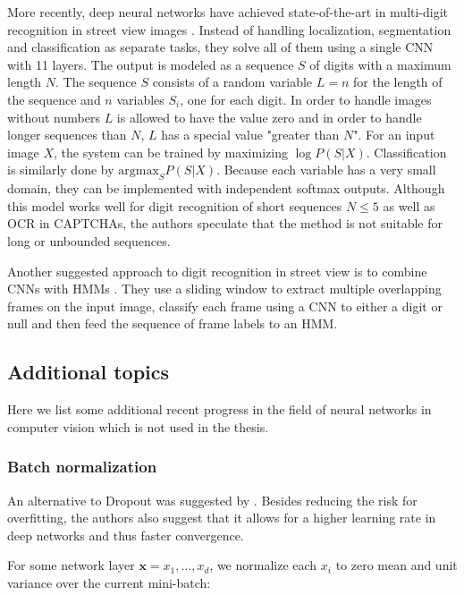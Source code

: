 More recently, deep neural networks have achieved state-of-the-art in multi-digit recognition in street view images \cite{multidigit_streetview}. Instead of handling localization, segmentation and classification as separate tasks, they solve all of them using a single CNN with 11 layers. The output is modeled as a sequence $S$ of digits with a maximum length $N$. The sequence $S$ consists of a random variable $L=n$ for the length of the sequence and $n$ variables $S_i$, one for each digit. In order to handle images without numbers $L$ is allowed to have the value zero and in order to handle longer sequences than $N$, $L$ has a special value "greater than $N$". For an input image $X$, the system can be trained by maximizing $\log P(S \vert X)$. Classification is similarly done by $\text{argmax}_S P(S \vert X)$.
Because each variable has a very small domain, they can be implemented with independent softmax outputs.
Although this model works well for digit recognition of short sequences $N \leq 5$ as well as OCR in CAPTCHAs, the authors speculate that the method is not suitable for long or unbounded sequences.

Another suggested approach to digit recognition in street view is to combine CNNs with HMMs \cite{multidigit_streetview_CNN_HMM}. They use a sliding window to extract multiple overlapping frames on the input image, classify each frame using a CNN to either a digit or null and then feed the sequence of frame labels to an HMM.



\subsection{Additional topics}

Here we list some additional recent progress in the field of neural networks in computer vision which is not used in the thesis.

\subsubsection{Batch normalization}

An alternative to Dropout was suggested by \cite{BatchNormalization}. Besides reducing the risk for overfitting, the authors also suggest that it allows for a higher learning rate in deep networks and thus faster convergence.

For some network layer $\mathbf{x} = {x_1, \ldots, x_d}$, we normalize each $x_i$ to zero mean and unit variance over the current mini-batch:

